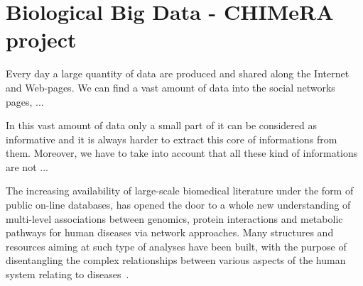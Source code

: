 \documentclass{standalone}
\begin{document}
\chapter[Big Data]{Biological Big Data - CHIMeRA project}\label{chapter3:bigdata}

Every day a large quantity of data are produced and shared along the Internet and Web-pages.
We can find a vast amount of data into the social networks pages, ...

In this vast amount of data only a small part of it can be considered as informative and it is always harder to extract this core of informations from them.
Moreover, we have to take into account that all these kind of informations are not ...


The increasing availability of large-scale biomedical literature under the form of public on-line databases, has opened the door to a whole new understanding of multi-level associations between genomics, protein interactions and metabolic pathways for human diseases via network approaches.
Many structures and resources aiming at such type of analyses have been built, with the purpose of disentangling the complex relationships between various aspects of the human system relating to diseases~\cite{SymtomsNet, HumanPhenotype}.


\end{document}
